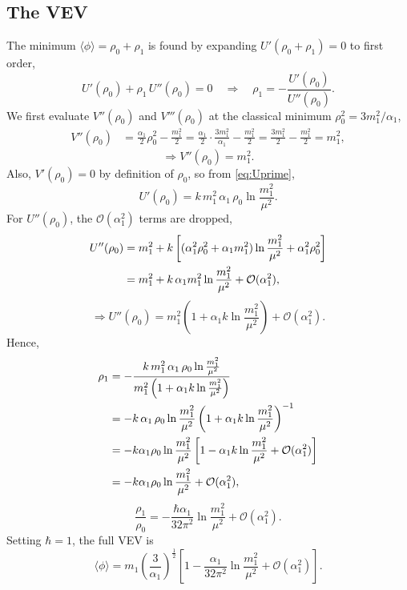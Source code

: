 \subsection*{The VEV}

The minimum $\langle\phi\rangle = \rho_0 + \rho_1$ is found by expanding
$U'(\rho_0+\rho_1)=0$ to first order,
\begin{equation}
    U'(\rho_0) + \rho_1\,U''(\rho_0) = 0
    \quad\Rightarrow\quad
    \rho_1 = -\frac{U'(\rho_0)}{U''(\rho_0)}.
\end{equation}
We first evaluate $V''(\rho_0)$ and $V'''(\rho_0)$ at the classical
minimum $\rho_0^2 = 3m_1^2/\alpha_1$,
\begin{align}
    V''(\rho_0) &= \frac{\alpha_1}{2}\rho_0^2 - \frac{m_1^2}{2}
    = \frac{\alpha_1}{2}\cdot\frac{3m_1^2}{\alpha_1} - \frac{m_1^2}{2}
    = \frac{3m_1^2}{2} - \frac{m_1^2}{2} = m_1^2,
\end{align}
\begin{equation}
    \Rightarrow V''(\rho_0) = m_1^2.
\end{equation}
Also, $V'(\rho_0) = 0$ by definition of $\rho_0$, so from
\eqref{eq:Uprime},
\begin{equation}
    U'(\rho_0) = k\,m_1^2\,\alpha_1\,\rho_0\ln\frac{m_1^2}{\mu^2}.
\end{equation}
For $U''(\rho_0)$, the $\mathcal{O}(\alpha_1^2)$ terms are dropped,
\begin{align}
    U''(\rho_0) &= m_1^2 + k\left[(\alpha_1^2\rho_0^2
    + \alpha_1 m_1^2)\ln\frac{m_1^2}{\mu^2}
    + \alpha_1^2\rho_0^2\right] \notag\\
    &= m_1^2 + k\,\alpha_1 m_1^2\ln\frac{m_1^2}{\mu^2}
    + \mathcal{O}(\alpha_1^2),
\end{align}
\begin{equation}
    \Rightarrow U''(\rho_0) = m_1^2\left(1
    + \alpha_1 k\ln\frac{m_1^2}{\mu^2}\right)
    + \mathcal{O}(\alpha_1^2).
\end{equation}
Hence,
\begin{align}
    \rho_1 &= -\frac{k\,m_1^2\,\alpha_1\,\rho_0\ln\frac{m_1^2}{\mu^2}}
    {m_1^2\left(1 + \alpha_1 k\ln\frac{m_1^2}{\mu^2}\right)} \notag\\
    &= -k\,\alpha_1\,\rho_0\ln\frac{m_1^2}{\mu^2}
    \left(1 + \alpha_1 k\ln\frac{m_1^2}{\mu^2}\right)^{-1} \notag\\
    &= -k\alpha_1\rho_0\ln\frac{m_1^2}{\mu^2}
    \left[1 - \alpha_1 k\ln\frac{m_1^2}{\mu^2}
    + \mathcal{O}(\alpha_1^2)\right] \notag\\
    &= -k\alpha_1\rho_0\ln\frac{m_1^2}{\mu^2} + \mathcal{O}(\alpha_1^2),
\end{align}
\begin{equation}
    \frac{\rho_1}{\rho_0} = -\frac{\hbar\alpha_1}{32\pi^2}
    \ln\frac{m_1^2}{\mu^2} + \mathcal{O}(\alpha_1^2).
\end{equation}
Setting $\hbar=1$, the full VEV is
\begin{equation}
    \boxed{\langle\phi\rangle = m_1\left(\frac{3}{\alpha_1}\right)^{\frac{1}{2}}
    \left[1 - \frac{\alpha_1}{32\pi^2}\ln\frac{m_1^2}{\mu^2}
    + \mathcal{O}(\alpha_1^2)\right].}
\end{equation}

